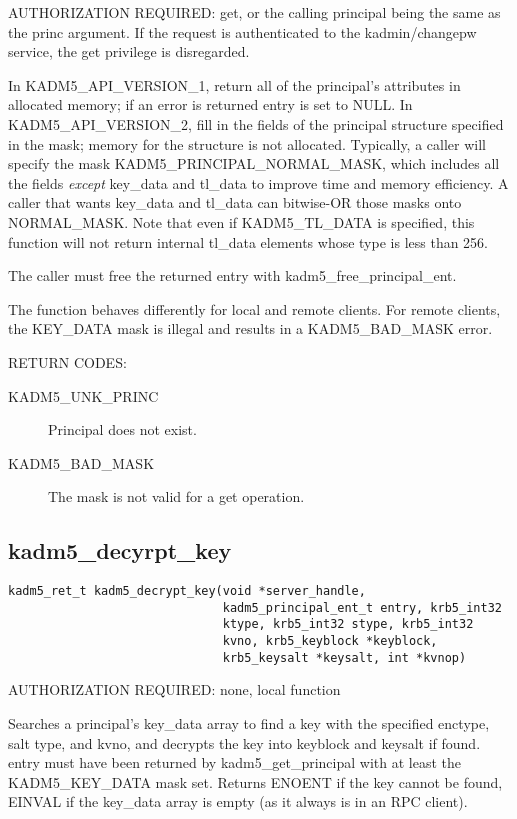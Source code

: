AUTHORIZATION REQUIRED: get, or the calling principal being the same
as the princ argument.  If the request is authenticated to the
kadmin/changepw service, the get privilege is disregarded.

In KADM5_API_VERSION_1, return all of the principal's attributes in
allocated memory; if an error is returned entry is set to NULL.  In
KADM5_API_VERSION_2, fill in the fields of the principal structure
specified in the mask; memory for the structure is not allocated.
Typically, a caller will specify the mask KADM5_PRINCIPAL_NORMAL_MASK,
which includes all the fields {\it except} key_data and tl_data to
improve time and memory efficiency.  A caller that wants key_data and
tl_data can bitwise-OR those masks onto NORMAL_MASK.  Note that even
if KADM5_TL_DATA is specified, this function will not return internal
tl_data elements whose type is less than 256.

The caller must free the returned entry with kadm5_free_principal_ent.

The function behaves differently for local and remote clients.  For
remote clients, the KEY_DATA mask is illegal and results in a
KADM5_BAD_MASK error.

RETURN CODES:

\begin{description}
\item[KADM5_UNK_PRINC] Principal does not exist.
\item[KADM5_BAD_MASK] The mask is not valid for a get operation.

\end{description}

\subsection{kadm5_decyrpt_key}

\begin{verbatim}
kadm5_ret_t kadm5_decrypt_key(void *server_handle,
                              kadm5_principal_ent_t entry, krb5_int32
                              ktype, krb5_int32 stype, krb5_int32
                              kvno, krb5_keyblock *keyblock,
                              krb5_keysalt *keysalt, int *kvnop)
\end{verbatim}

AUTHORIZATION REQUIRED: none, local function

Searches a principal's key_data array to find a key with the specified
enctype, salt type, and kvno, and decrypts the key into keyblock and
keysalt if found.  entry must have been returned by
kadm5_get_principal with at least the KADM5_KEY_DATA mask set.
Returns ENOENT if the key cannot be found, EINVAL if the key_data
array is empty (as it always is in an RPC client).

